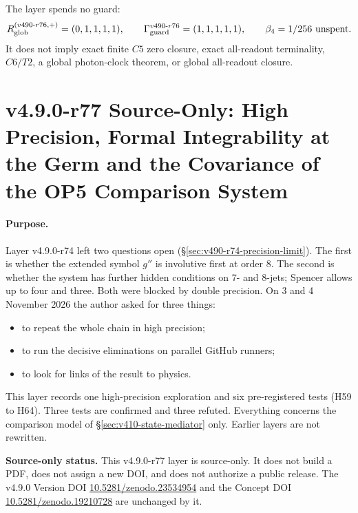The layer spends no guard:
\[
R_{\rm glob}^{(v490\text{-}r76,+)}=(0,1,1,1,1),
\qquad
\Gamma_{\rm guard}^{v490\text{-}r76}=(1,1,1,1,1),
\qquad
\beta_4=1/256\ \text{unspent}.
\]
It does not imply exact finite \(C5\) zero closure, exact all-readout terminality,
\(C6/T2\), a global photon-clock theorem, or global all-readout closure.

\clearpage
\section*{v4.9.0-r77 Source-Only: High Precision, Formal Integrability at the Germ and the Covariance of the OP5 Comparison System}
\label{sec:v490-r77-high-precision-covariance}

\paragraph{Purpose.}
Layer v4.9.0-r74 left two questions open (\S\ref{sec:v490-r74-precision-limit}).  The first is whether the extended symbol
\(g''\) is involutive first at order 8.  The second is whether the system has further hidden conditions on 7- and 8-jets;
Spencer allows up to four and three.  Both were blocked by double precision.  On 3 and 4 November 2026 the author asked
for three things:
\begin{itemize}[leftmargin=2em]
\item to repeat the whole chain in high precision;
\item to run the decisive eliminations on parallel GitHub runners;
\item to look for links of the result to physics.
\end{itemize}
This layer records one high-precision exploration and six pre-registered tests (H59 to H64).  Three tests are confirmed
and three refuted.  Everything concerns the comparison model of \S\ref{sec:v410-state-mediator} only.  Earlier layers are
not rewritten.

\noindent\textbf{Source-only status.}
This v4.9.0-r77 layer is source-only.  It does not build a PDF, does not assign a new DOI,
and does not authorize a public release.  The v4.9.0 Version DOI
\href{https://doi.org/10.5281/zenodo.23534954}{10.5281/zenodo.23534954} and the Concept DOI
\href{https://doi.org/10.5281/zenodo.19210728}{10.5281/zenodo.19210728} are unchanged by it.

